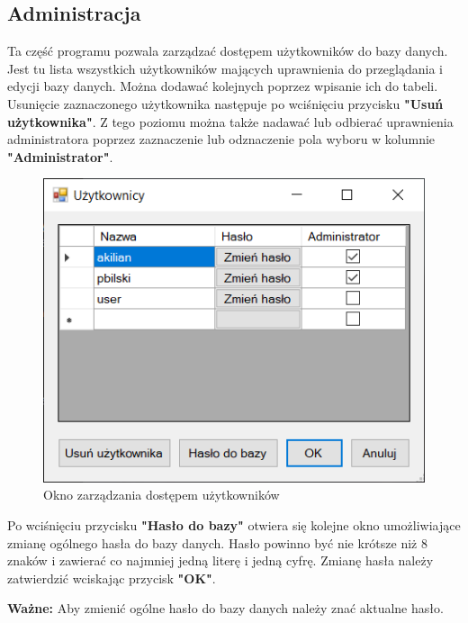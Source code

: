 \subsection{Administracja}
\label{admin}

Ta część programu pozwala zarządzać dostępem użytkowników do bazy danych. Jest tu lista wszystkich użytkowników mających uprawnienia do przeglądania i edycji bazy danych. Można dodawać kolejnych poprzez wpisanie ich do tabeli. Usunięcie zaznaczonego użytkownika następuje po wciśnięciu przycisku \textbf{"Usuń użytkownika"}. Z tego poziomu można także nadawać lub odbierać uprawnienia administratora poprzez zaznaczenie lub odznaczenie pola wyboru w kolumnie \textbf{"Administrator"}.

\begin{figure}[htb]
	\centering
	\includegraphics{obrazki/Logowanie/administracja.png}
	\caption{Okno zarządzania dostępem użytkowników}
	\label{administracja}
\end{figure}

Po wciśnięciu przycisku \textbf{"Hasło do bazy"} otwiera się kolejne okno umożliwiające zmianę ogólnego hasła do bazy danych. Hasło powinno być nie krótsze niż 8 znaków i zawierać co najmniej jedną literę i jedną cyfrę. Zmianę hasła należy zatwierdzić wciskając przycisk \textbf{"OK"}.

\textbf{Ważne:} Aby zmienić ogólne hasło do bazy danych należy znać aktualne hasło.

